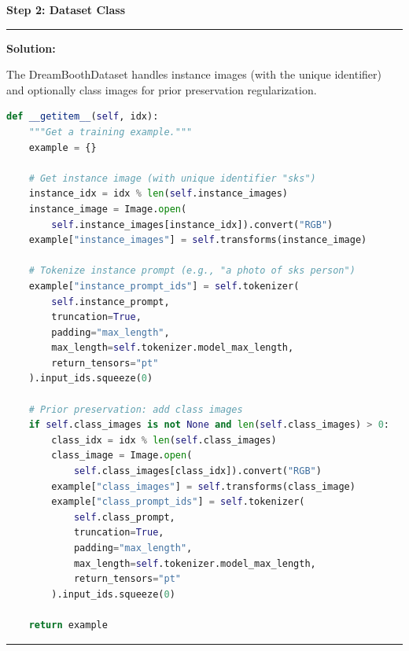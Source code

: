 \documentclass[a4paper,12pt]{article}
\newenvironment{solutionbox}{
    \par
    \vspace{0.5em}
    \noindent
    {\color{primary}\rule{\linewidth}{0.4pt}}
    \par\smallskip
    \noindent\textbf{\color{primary}Solution:}
    \par\smallskip
    \small
}{
    \par\smallskip
    {\color{primary}\rule{\linewidth}{0.4pt}}
    \par\vspace{0.5em}
}
\begin{document}
\textbf{Step 2: Dataset Class}
\begin{solutionbox}
    The DreamBoothDataset handles instance images (with the unique identifier) and optionally class images for prior preservation regularization.
    
\begin{lstlisting}[language=Python]
def __getitem__(self, idx):
    """Get a training example."""
    example = {}
    
    # Get instance image (with unique identifier "sks")
    instance_idx = idx % len(self.instance_images)
    instance_image = Image.open(
        self.instance_images[instance_idx]).convert("RGB")
    example["instance_images"] = self.transforms(instance_image)
    
    # Tokenize instance prompt (e.g., "a photo of sks person")
    example["instance_prompt_ids"] = self.tokenizer(
        self.instance_prompt,
        truncation=True,
        padding="max_length",
        max_length=self.tokenizer.model_max_length,
        return_tensors="pt"
    ).input_ids.squeeze(0)
    
    # Prior preservation: add class images
    if self.class_images is not None and len(self.class_images) > 0:
        class_idx = idx % len(self.class_images)
        class_image = Image.open(
            self.class_images[class_idx]).convert("RGB")
        example["class_images"] = self.transforms(class_image)
        example["class_prompt_ids"] = self.tokenizer(
            self.class_prompt,
            truncation=True,
            padding="max_length",
            max_length=self.tokenizer.model_max_length,
            return_tensors="pt"
        ).input_ids.squeeze(0)
    
    return example
\end{lstlisting}
\end{solutionbox}
\end{document}
